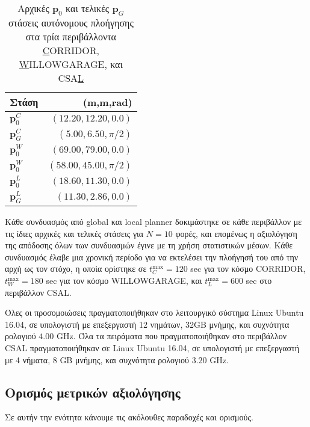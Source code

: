 \begin{table}[h]\centering
  \renewcommand{\arraystretch}{1.3}
  \begin{tabular}{lr}
    Στάση         & (m,m,rad)             \\ \toprule
    $\bm{p}_0^C$  & $(12.20,12.20,0.0)$   \\
    $\bm{p}_G^C$  & $(5.00,6.50,\pi/2)$   \\ \midrule
    $\bm{p}_0^W$  & $(69.00,79.00,0.0)$   \\
    $\bm{p}_0^W$  & $(58.00,45.00,\pi/2)$ \\ \midrule
    $\bm{p}_0^L$  & $(18.60,11.30,0.0)$   \\
    $\bm{p}_G^L$  & $(11.30,2.86,0.0)$    \\ \bottomrule
    \end{tabular}
  \caption{\small Αρχικές $\bm{p}_0$ και τελικές $\bm{p}_G$ στάσεις αυτόνομους
           πλοήγησης στα τρία περιβάλλοντα \underline{C}ORRIDOR,
           \underline{W}ILLOWGARAGE, και CSA\underline{L}}
  \label{tbl:02_01_03:initial_and_goal_poses}
\end{table}

Κάθε συνδυασμός από global και local planner δοκιμάστηκε σε κάθε περιβάλλον με
τις ίδιες αρχικές και τελικές στάσεις για $N = 10$ φορές, και επομένως η
αξιολόγηση της απόδοσης όλων των συνδυασμών έγινε με τη χρήση στατιστικών
μέσων. Κάθε συνδυασμός έλαβε μια χρονική περίοδο για να εκτελέσει την πλοήγησή
του από την αρχή ως τον στόχο, η οποία ορίστηκε σε $t_C^{\max} = 120$ sec για
τον κόσμο CORRIDOR, $t_W^{\max} = 180$ sec για τον κόσμο WILLOWGARAGE, και
$t_L^{\max} = 600$ sec στο περιβάλλον CSAL.

Όλες οι προσομοιώσεις πραγματοποιήθηκαν στο λειτουργικό σύστημα Linux Ubuntu
16.04, σε υπολογιστή με επεξεργαστή 12 νημάτων, 32GB μνήμης, και συχνότητα
ρολογιού $4.00$ GHz. Όλα τα πειράματα που πραγματοποιήθηκαν στο περιβάλλον CSAL
πραγματοποιήθηκαν σε Linux Ubuntu 16.04, σε υπολογιστή με επεξεργαστή με 4
νήματα, $8$ GB μνήμης, και συχνότητα ρολογιού $3.20$ GHz.



\subsection{Ορισμός μετρικών αξιολόγησης}
\label{subsection:02_01_03:02}

Σε αυτήν την ενότητα κάνουμε τις ακόλουθες παραδοχές και ορισμούς.

